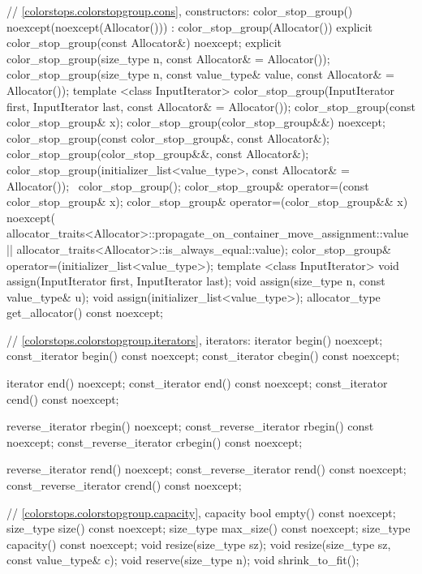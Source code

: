 \begin{codeblock}
{{{{{    // \ref{colorstops.colorstopgroup.cons}, constructors:    
    color_stop_group() noexcept(noexcept(Allocator())) :
    color_stop_group(Allocator()) { }
    explicit color_stop_group(const Allocator&) noexcept;
    explicit color_stop_group(size_type n, const Allocator& = Allocator());
    color_stop_group(size_type n, const value_type& value,
      const Allocator& = Allocator());
    template <class InputIterator>
    color_stop_group(InputIterator first, InputIterator last,
    const Allocator& = Allocator());
    color_stop_group(const color_stop_group& x);
    color_stop_group(color_stop_group&&) noexcept;
    color_stop_group(const color_stop_group&, const Allocator&);
    color_stop_group(color_stop_group&&, const Allocator&);
    color_stop_group(initializer_list<value_type>,
      const Allocator& = Allocator());
    ~color_stop_group();
    color_stop_group& operator=(const color_stop_group& x);
    color_stop_group& operator=(color_stop_group&& x)
      noexcept(
      allocator_traits<Allocator>::propagate_on_container_move_assignment::value
      || allocator_traits<Allocator>::is_always_equal::value);
    color_stop_group& operator=(initializer_list<value_type>);
    template <class InputIterator>
    void assign(InputIterator first, InputIterator last);
    void assign(size_type n, const value_type& u);
    void assign(initializer_list<value_type>);
    allocator_type get_allocator() const noexcept;
    
    // \ref{colorstops.colorstopgroup.iterators}, iterators:
    iterator begin() noexcept;
    const_iterator begin() const noexcept;
    const_iterator cbegin() const noexcept;
    
    iterator end() noexcept;
    const_iterator end() const noexcept;
    const_iterator cend() const noexcept;
    
    reverse_iterator rbegin() noexcept;
    const_reverse_iterator rbegin() const noexcept;
    const_reverse_iterator crbegin() const noexcept;
    
    reverse_iterator rend() noexcept;
    const_reverse_iterator rend() const noexcept;
    const_reverse_iterator crend() const noexcept;
    
    // \ref{colorstops.colorstopgroup.capacity}, capacity
    bool empty() const noexcept;
    size_type size() const noexcept;
    size_type max_size() const noexcept;
    size_type capacity() const noexcept;
    void resize(size_type sz);
    void resize(size_type sz, const value_type& c);
    void reserve(size_type n);
    void shrink_to_fit();
    
}}}}}
\end{codeblock}
